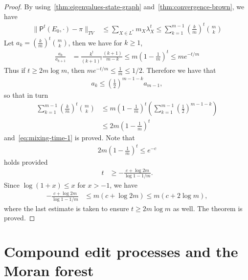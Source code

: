 \documentclass[11pt,a4paper]{article}
\begin{document}
\begin{proof}
    By using~\cref{thm:eigenvalues-state-graph} and~\cref{thm:convergence-brown}, we have
        \begin{align*}
            \|\mathsf{P}^t(E_0, \cdot) - \pi\|_{TV}&\leq \sum_{X\in L^\ast} m_X\lambda_X^t\leq \sum_{k=1}^{m-1}\left(\frac{k}{m}\right)^t{m\choose k}
        \end{align*}
    Let $a_k = \left(\frac{k}{m}\right)^t{m\choose k}$, then we have for $k\geq 1$, 
        \begin{align*}
            \frac{a_k}{a_{k+1}} &= \frac{k^t}{(k+1)^t}\frac{(k+1)}{m-k} \leq m\left(1 - \frac{1}{m}\right)^t\leq m e^{-t/m}
        \end{align*}
    Thus if $t \geq 2m\log{m}$, then $m e^{-t/m}\leq \frac{1}{m} \leq 1/2$. Therefore we have that
        \begin{align*}
            a_k \leq \left(\frac{1}{2}\right)^{m-1-k} a_{m-1},
        \end{align*}
    so that in turn
        \begin{align*}
            \sum_{k=1}^{m-1}\left(\frac{k}{m}\right)^t{m\choose k} &\leq m\left(1-\frac{1}{m}\right)^t\left(\sum_{k=1}^{m-1} \left(\frac{1}{2}\right)^{m-1-k}\right)\\
            &\leq 2m\left(1-\frac{1}{m}\right)^t
        \end{align*}
    and~\cref{eq:mixing-time-1} is proved. Note that
        \begin{align*}
            2m\left(1-\frac{1}{m}\right)^t \leq e^{-c}
        \end{align*}
    holds provided
        \begin{align*}
            t&\geq -\frac{c+\log{2m}}{\log{1-1/m}}.
        \end{align*}
    Since $\log(1+x)\leq x$ for $x>-1$, we have
        \begin{align*}
            -\frac{c+\log{2m}}{\log{1-1/m}} &\leq m(c+\log{2m}) \leq m(c+2\log{m}),
        \end{align*}
    where the last estimate is taken to ensure $t\geq 2m\log{m}$ as well. The theorem is proved.
\end{proof}
	
\section{Compound edit processes and the Moran forest}\label{sec:application-subsemigroups}
\end{document}
